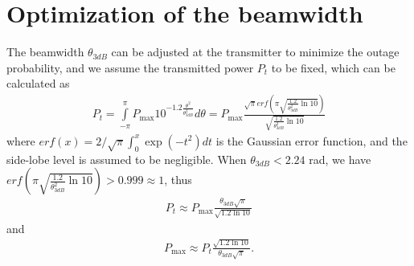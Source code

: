 \documentclass{IEEEtran}
\begin{document}
\section{Optimization of the beamwidth}
The beamwidth $\theta_{3dB}$ can be adjusted at the transmitter to minimize the outage probability, and we assume the transmitted power $P_t$ to be fixed, which can be calculated as
\begin{equation}\label{eq-27}
\begin{split}
P_t=\int\limits_{ - {\pi} }^{{\pi}}  {{P_{\max }}{{10}^{ - 1.2\frac{{{\theta ^2}}}{{\theta _{3dB}^2}}}}d\theta } = {P_{\max }}\frac{{\sqrt \pi  erf \left( {{\pi} \sqrt {\frac{{1.2}}{{\theta _{3dB}^2}}\ln 10} } \right)}}{{\sqrt {\frac{{1.2}}{{\theta _{3dB}^2}}\ln 10} }}
\end{split}
\end{equation}
where $erf(x)=2/\sqrt{\pi} \int_0^x \exp(-t^2) dt$ is the Gaussian error function, and the side-lobe level is assumed to be negligible. {When $\theta_{3dB}<2.24$ rad, we have $erf \left( {{\pi} \sqrt {\frac{{1.2}}{{\theta _{3dB}^2}}\ln 10} } \right)>0.999 \approx 1$}, thus
\begin{equation}\label{eq-28}
\begin{split}
P_t  \approx {P_{\max }}\frac{{{\theta _{3dB}}\sqrt \pi  }}{{\sqrt {1.2\ln 10} }}
\end{split}
\end{equation}
and
\begin{equation}\label{eq-29}
\begin{split}
{P_{\max }} \approx {P_t}\frac{{\sqrt {1.2\ln 10} }}{{{\theta _{3dB}}\sqrt \pi  }}.
\end{split}
\end{equation}
\end{document}
